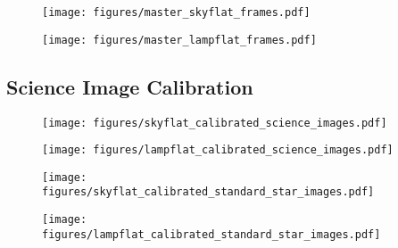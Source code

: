 \documentclass[twocolumn]{aastex631}
\begin{document}
\begin{figure}[ht!]
    \begin{centering}
        \texttt{[image: figures/master\_skyflat\_frames.pdf]}
        \caption{}
        \label{fig:master_skyflat}
    \end{centering}
\end{figure}

\begin{figure}[ht!]
    \begin{centering}
        \texttt{[image: figures/master\_lampflat\_frames.pdf]}
        \caption{}
        \label{fig:master_lampflat}
    \end{centering}
\end{figure}

\subsection{Science Image Calibration}
\label{subsec:im_cal}


\begin{figure}[ht!]
    \begin{centering}
        \texttt{[image: figures/skyflat\_calibrated\_science\_images.pdf]}
        \caption{}
        \label{fig:master_dark}
    \end{centering}
\end{figure}

\begin{figure}[ht!]
    \begin{centering}
        \texttt{[image: figures/lampflat\_calibrated\_science\_images.pdf]}
        \caption{}
        \label{fig:master_dark}
    \end{centering}
\end{figure}

\begin{figure}[ht!]
    \begin{centering}
        \texttt{[image: figures/skyflat\_calibrated\_standard\_star\_images.pdf]}
        \caption{}
        \label{fig:master_dark}
    \end{centering}
\end{figure}

\begin{figure}[ht!]
    \begin{centering}
        \texttt{[image: figures/lampflat\_calibrated\_standard\_star\_images.pdf]}
        \caption{}
        \label{fig:master_dark}
    \end{centering}
\end{figure}



\end{document}
